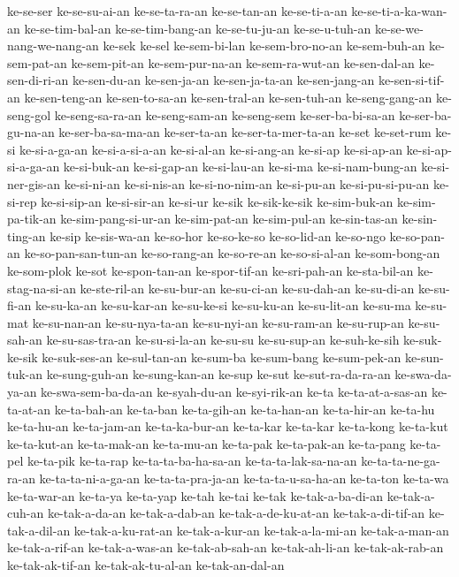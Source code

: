 {ke-se-ser ke-se-su-ai-an ke-se-ta-ra-an ke-se-tan-an ke-se-ti-a-an
ke-se-ti-a-ka-wan-an ke-se-tim-bal-an ke-se-tim-bang-an ke-se-tu-ju-an
ke-se-u-tuh-an ke-se-we-nang-we-nang-an ke-sek ke-sel ke-sem-bi-lan
ke-sem-bro-no-an ke-sem-buh-an ke-sem-pat-an ke-sem-pit-an
ke-sem-pur-na-an ke-sem-ra-wut-an ke-sen-dal-an ke-sen-di-ri-an
ke-sen-du-an ke-sen-ja-an ke-sen-ja-ta-an ke-sen-jang-an ke-sen-si-tif-an
ke-sen-teng-an ke-sen-to-sa-an ke-sen-tral-an ke-sen-tuh-an
ke-seng-gang-an ke-seng-gol ke-seng-sa-ra-an ke-seng-sam-an ke-seng-sem
ke-ser-ba-bi-sa-an ke-ser-ba-gu-na-an ke-ser-ba-sa-ma-an ke-ser-ta-an
ke-ser-ta-mer-ta-an ke-set ke-set-rum ke-si ke-si-a-ga-an ke-si-a-si-a-an
ke-si-al-an ke-si-ang-an ke-si-ap ke-si-ap-an ke-si-ap-si-a-ga-an
ke-si-buk-an ke-si-gap-an ke-si-lau-an ke-si-ma ke-si-nam-bung-an
ke-si-ner-gis-an ke-si-ni-an ke-si-nis-an ke-si-no-nim-an ke-si-pu-an
ke-si-pu-si-pu-an ke-si-rep ke-si-sip-an ke-si-sir-an ke-si-ur ke-sik
ke-sik-ke-sik ke-sim-buk-an ke-sim-pa-tik-an ke-sim-pang-si-ur-an
ke-sim-pat-an ke-sim-pul-an ke-sin-tas-an ke-sin-ting-an ke-sip
ke-sis-wa-an ke-so-hor ke-so-ke-so ke-so-lid-an ke-so-ngo ke-so-pan-an
ke-so-pan-san-tun-an ke-so-rang-an ke-so-re-an ke-so-si-al-an
ke-som-bong-an ke-som-plok ke-sot ke-spon-tan-an ke-spor-tif-an
ke-sri-pah-an ke-sta-bil-an ke-stag-na-si-an ke-ste-ril-an ke-su-bur-an
ke-su-ci-an ke-su-dah-an ke-su-di-an ke-su-fi-an ke-su-ka-an ke-su-kar-an
ke-su-ke-si ke-su-ku-an ke-su-lit-an ke-su-ma ke-su-mat ke-su-nan-an
ke-su-nya-ta-an ke-su-nyi-an ke-su-ram-an ke-su-rup-an ke-su-sah-an
ke-su-sas-tra-an ke-su-si-la-an ke-su-su ke-su-sup-an ke-suh-ke-sih
ke-suk-ke-sik ke-suk-ses-an ke-sul-tan-an ke-sum-ba ke-sum-bang
ke-sum-pek-an ke-sun-tuk-an ke-sung-guh-an ke-sung-kan-an ke-sup ke-sut
ke-sut-ra-da-ra-an ke-swa-da-ya-an ke-swa-sem-ba-da-an ke-syah-du-an
ke-syi-rik-an ke-ta ke-ta-at-a-sas-an ke-ta-at-an ke-ta-bah-an ke-ta-ban
ke-ta-gih-an ke-ta-han-an ke-ta-hir-an ke-ta-hu ke-ta-hu-an ke-ta-jam-an
ke-ta-ka-bur-an ke-ta-kar ke-ta-kar ke-ta-kong ke-ta-kut ke-ta-kut-an
ke-ta-mak-an ke-ta-mu-an ke-ta-pak ke-ta-pak-an ke-ta-pang ke-ta-pel
ke-ta-pik ke-ta-rap ke-ta-ta-ba-ha-sa-an ke-ta-ta-lak-sa-na-an
ke-ta-ta-ne-ga-ra-an ke-ta-ta-ni-a-ga-an ke-ta-ta-pra-ja-an
ke-ta-ta-u-sa-ha-an ke-ta-ton ke-ta-wa ke-ta-war-an ke-ta-ya ke-ta-yap
ke-tah ke-tai ke-tak ke-tak-a-ba-di-an ke-tak-a-cuh-an ke-tak-a-da-an
ke-tak-a-dab-an ke-tak-a-de-ku-at-an ke-tak-a-di-tif-an ke-tak-a-dil-an
ke-tak-a-ku-rat-an ke-tak-a-kur-an ke-tak-a-la-mi-an ke-tak-a-man-an
ke-tak-a-rif-an ke-tak-a-was-an ke-tak-ab-sah-an ke-tak-ah-li-an
ke-tak-ak-rab-an ke-tak-ak-tif-an ke-tak-ak-tu-al-an ke-tak-an-dal-an
}
